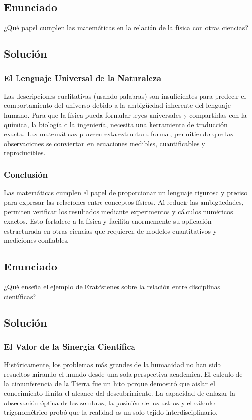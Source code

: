 \documentclass[12pt, a4paper]{article}
\begin{document}
\subsection*{Enunciado}
¿Qué papel cumplen las matemáticas en la relación de la física con otras ciencias?

\subsection*{Solución}

\subsubsection*{El Lenguaje Universal de la Naturaleza}
Las descripciones cualitativas (usando palabras) son insuficientes para predecir el comportamiento del universo debido a la ambigüedad inherente del lenguaje humano. Para que la física pueda formular leyes universales y compartirlas con la química, la biología o la ingeniería, necesita una herramienta de traducción exacta. Las matemáticas proveen esta estructura formal, permitiendo que las observaciones se conviertan en ecuaciones medibles, cuantificables y reproducibles.

\subsubsection*{Conclusión}
Las matemáticas cumplen el papel de proporcionar un lenguaje riguroso y preciso para expresar las relaciones entre conceptos físicos. Al reducir las ambigüedades, permiten verificar los resultados mediante experimentos y cálculos numéricos exactos. Esto fortalece a la física y facilita enormemente su aplicación estructurada en otras ciencias que requieren de modelos cuantitativos y mediciones confiables.

\newpage

\subsection*{Enunciado}
¿Qué enseña el ejemplo de Eratóstenes sobre la relación entre disciplinas científicas?

\subsection*{Solución}

\subsubsection*{El Valor de la Sinergia Científica}
Históricamente, los problemas más grandes de la humanidad no han sido resueltos mirando el mundo desde una sola perspectiva académica. El cálculo de la circunferencia de la Tierra fue un hito porque demostró que aislar el conocimiento limita el alcance del descubrimiento. La capacidad de enlazar la observación óptica de las sombras, la posición de los astros y el cálculo trigonométrico probó que la realidad es un solo tejido interdisciplinario.
\end{document}
